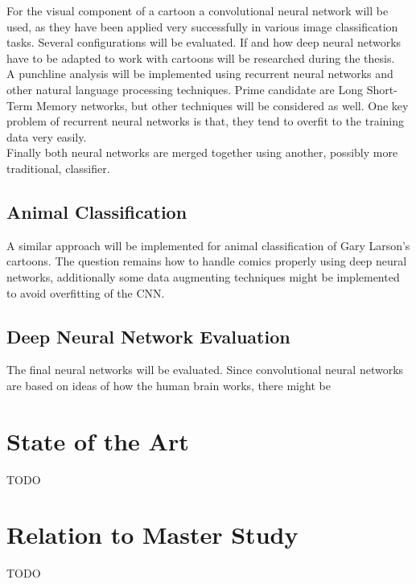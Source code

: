 \documentclass[11pt]{article}
\begin{document}
For the visual component of a cartoon a convolutional neural network will be used, as they have been applied very successfully in various image classification tasks. Several configurations will be evaluated. If and how deep neural networks have to be adapted to work with cartoons will be researched during the thesis.\\

A punchline analysis will be implemented using recurrent neural networks and other natural language processing techniques. Prime candidate are Long Short-Term Memory networks, but other techniques will be considered as well. One key problem of recurrent neural networks is that, they tend to overfit to the training data very easily.\\

Finally both neural networks are merged together using another, possibly more traditional, classifier. \\

\pagebreak
\subsection {Animal Classification}

A similar approach will be implemented for animal classification of Gary Larson's cartoons. The question remains how to handle comics properly using deep neural networks, additionally some data augmenting techniques might be implemented to avoid overfitting of the CNN.

\subsection {Deep Neural Network Evaluation}

The final neural networks will be evaluated. Since convolutional neural networks are based on ideas of how the human brain works, there might be 

\pagebreak
\section{State of the Art}
TODO

\pagebreak
\section{Relation to Master Study	}
TODO
\end{document}

